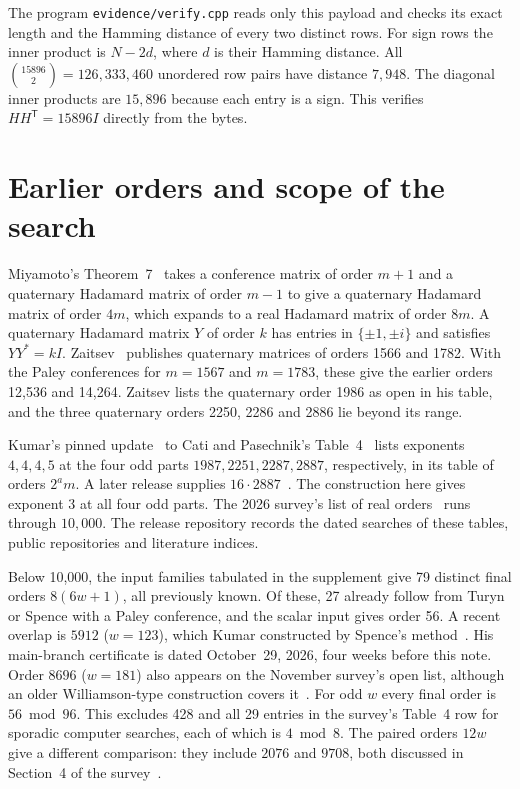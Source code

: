 \documentclass[10pt]{article}
\newcommand{\tr}{^{\mathsf T}}
\begin{document}
The program \texttt{evidence/verify.cpp} reads only this payload and checks its exact length and the Hamming distance of every two distinct rows. For sign rows the inner product is $N-2d$, where $d$ is their Hamming distance. All $\binom{15896}{2}=126{,}333{,}460$ unordered row pairs have distance $7{,}948$. The diagonal inner products are $15{,}896$ because each entry is a sign. This verifies $HH\tr=15896I$ directly from the bytes.

\section{Earlier orders and scope of the search}

Miyamoto's Theorem~7~\cite{Mi91} takes a conference matrix of order $m+1$ and a quaternary Hadamard matrix of order $m-1$ to give a quaternary Hadamard matrix of order $4m$, which expands to a real Hadamard matrix of order $8m$. A quaternary Hadamard matrix $Y$ of order $k$ has entries in $\{\pm1,\pm i\}$ and satisfies $YY^*=kI$. Zaitsev~\cite{Zai} publishes quaternary matrices of orders 1566 and 1782. With the Paley conferences for $m=1567$ and $m=1783$, these give the earlier orders 12,536 and 14,264. Zaitsev lists the quaternary order 1986 as open in his table, and the three quaternary orders 2250, 2286 and 2886 lie beyond its range.

Kumar's pinned update~\cite{Ku} to Cati and Pasechnik's Table~4~\cite{CP} lists exponents $4,4,4,5$ at the four odd parts $1987,2251,2287,2887$, respectively, in its table of orders $2^a m$. A later release supplies $16\cdot2887$~\cite{KlLarge}. The construction here gives exponent $3$ at all four odd parts. The 2026 survey's list of real orders~\cite{EKLO} runs through $10{,}000$. The release repository records the dated searches of these tables, public repositories and literature indices.

Below 10,000, the input families tabulated in the supplement give 79 distinct final orders $8(6w+1)$, all previously known. Of these, 27 already follow from Turyn or Spence with a Paley conference, and the scalar input gives order 56. A recent overlap is $5912$ ($w=123$), which Kumar constructed by Spence's method~\cite{Ku}. His main-branch certificate is dated October~29, 2026, four weeks before this note. Order $8696$ ($w=181$) also appears on the November survey's open list, although an older Williamson-type construction covers it~\cite{Ku,EKLO}. For odd $w$ every final order is $56\bmod 96$. This excludes 428 and all 29 entries in the survey's Table~4 row for sporadic computer searches, each of which is $4\bmod 8$. The paired orders $12w$ give a different comparison: they include $2076$ and $9708$, both discussed in Section~4 of the survey~\cite{EKLO}.
\end{document}
